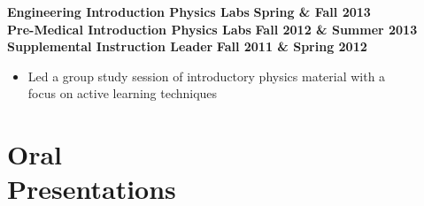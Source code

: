\documentclass[margin]{res}
\begin{document}
\begin{resume}
\begin{itemize}
    \end{itemize} \vspace{-12pt}
\textbf{Engineering Introduction Physics Labs} \hfill{} \textbf{Spring \& Fall 2013}\\
\textbf{Pre-Medical Introduction Physics Labs} \hfill{} \textbf{Fall 2012 \& Summer 2013}\\
{\bf Supplemental Instruction Leader} \hfill{} \textbf{Fall 2011 \& Spring 2012}
    \begin{itemize}\itemsep -2pt
    \item[] Led a group study session of introductory physics material with a \\focus on active learning techniques
    \end{itemize}

\begin{comment}
year |   Fall        | Spring        | Summer
1st  | Labs-premed   | labs-eng      | labs-premed
2nd  | Labs-eng      | RA            | RA
3rd  | RA/IntroAstro | Peter's intro | RA
4th  | IntroAstro    | Python        | RA
5th  | Physics C HW  | RA            | RA & REU classes
6th  | Fellowship (GRE Class) | Python | NA!?!
\end{comment}








\section{Oral \\Presentations}


\end{resume}
\end{document}
